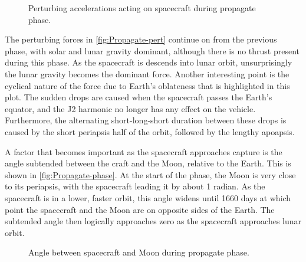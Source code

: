 \begin{figure}
\caption{Perturbing accelerations acting on spacecraft during propagate phase.}
\label{fig:Propagate-pert}
\centering
\def\svgwidth{\figurewidth}

\end{figure}

The perturbing forces in \autoref{fig:Propagate-pert} continue on from the previous phase, with solar and lunar gravity dominant, although there is no thrust present during this phase. As the spacecraft is descends into lunar orbit, unsurprisingly the lunar gravity becomes the dominant force. Another interesting point is the cyclical nature of the force due to Earth's oblateness that is highlighted in this plot. The sudden drops are caused when the spacecraft passes the Earth's equator, and the J2 harmonic no longer has any effect on the vehicle. Furthermore, the alternating short-long-short duration between these drops is caused by the short periapsis half of the orbit, followed by the lengthy apoapsis.

%

A factor that becomes important as the spacecraft approaches capture is the angle subtended between the craft and the Moon, relative to the Earth. This is shown in \autoref{fig:Propagate-phase}. At the start of the phase, the Moon is very close to its periapsis, with the spacecraft leading it by about 1 radian. As the spacecraft is in a lower, faster orbit, this angle widens until 1660 days at which point the spacecraft and the Moon are on opposite sides of the Earth. The subtended angle then logically approaches zero as the spacecraft approaches lunar orbit.

\begin{figure}
\caption{Angle between spacecraft and Moon during propagate phase.}
\label{fig:Propagate-phase}
\centering
\def\svgwidth{\figurewidth}

\end{figure}


\clearpage


